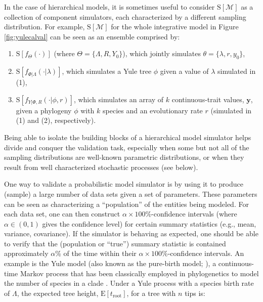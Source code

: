 \documentclass[oneside]{article}
\begin{document}
In the case of hierarchical models, it is sometimes useful to consider $\text{S}[\mathcal{M}]$ as a collection of component simulators, each characterized by a different sampling distribution.
For example, $\text{S}[\mathcal{M}]$ for the whole integrative model in Figure \ref{fig:yulecalval} can be seen as an ensemble comprised by:
\begin{enumerate}
  \item $\text{S}[f_\Theta(\cdot)]$ (where $\Theta = \{\Lambda, R, Y_0\}$), which jointly simulates $\theta=\{\lambda,r,y_0\}$,
  \item $\text{S}[f_{\Phi|\Lambda}(\cdot|\lambda)]$, which simulates a Yule tree $\phi$ given a value of $\lambda$ simulated in (1),
  \item $\text{S}[f_{Y|\Phi,R}(\cdot|\phi,r)]$, which simulates an array of $k$ continuous-trait values, $\boldsymbol{y}$, given a phylogeny $\phi$ with $k$ species and an evolutionary rate $r$ (simulated in (1) and (2), respectively).
\end{enumerate}
Being able to isolate the building blocks of a hierarchical model simulator helps divide and conquer the validation task, especially when some but not all of the sampling distributions are well-known parametric distributions, or when they result from well characterized stochastic processes (see below).

One way to validate a probabilistic model simulator is by using it to produce (sample) a large number of data sets given a set of parameters.
These parameters can be seen as characterizing a ``population'' of the entities being modeled.
For each data set, one can then construct $\alpha \times 100 \%$-confidence intervals (where $\alpha \in (0,1)$ gives the confidence level) for certain summary statistics (e.g., mean, variance, covariance).
If the simulator is behaving as expected, one should be able to verify that the (population or ``true'') summary statistic is contained approximately $\alpha$\% of the time within their $\alpha \times 100\%$-confidence intervals.
An example is the Yule model (also known as the pure-birth model; \citealt{yule24}), a continuous-time Markov process that has been classically employed in phylogenetics to model the number of species in a clade \citep{yule24,aldous01}.
Under a Yule process with a species birth rate of $\Lambda$, the expected tree height, $\text{E}[t_{\text{root}}]$, for a tree with $n$ tips is:
\vspace{.5cm}
\end{document}
